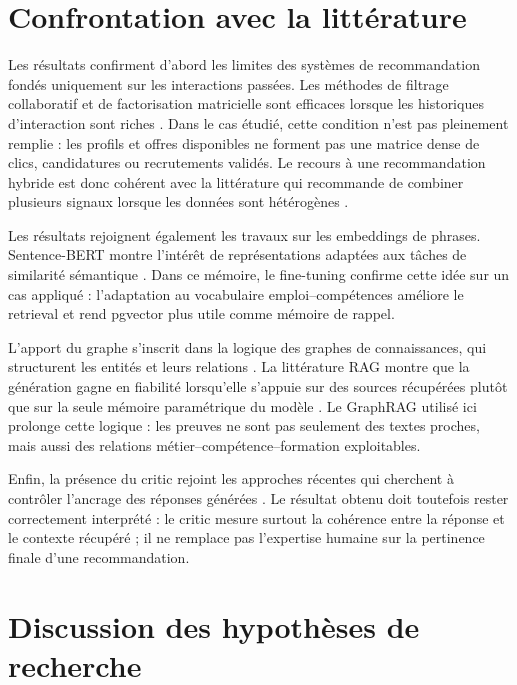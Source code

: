 \documentclass[12pt,twoside]{report}
\begin{document}
\section{Confrontation avec la littérature}

Les résultats confirment d'abord les limites des systèmes de recommandation fondés uniquement sur les interactions passées. Les méthodes de filtrage collaboratif et de factorisation matricielle sont efficaces lorsque les historiques d'interaction sont riches \cite{koren2009matrix,he2017ncf}. Dans le cas étudié, cette condition n'est pas pleinement remplie : les profils et offres disponibles ne forment pas une matrice dense de clics, candidatures ou recrutements validés. Le recours à une recommandation hybride est donc cohérent avec la littérature qui recommande de combiner plusieurs signaux lorsque les données sont hétérogènes \cite{burke2002hybrid,ricci2011recommender}.

Les résultats rejoignent également les travaux sur les embeddings de phrases. Sentence-BERT montre l'intérêt de représentations adaptées aux tâches de similarité sémantique \cite{reimers2019sbert}. Dans ce mémoire, le fine-tuning confirme cette idée sur un cas appliqué : l'adaptation au vocabulaire emploi--compétences améliore le retrieval et rend pgvector plus utile comme mémoire de rappel.

L'apport du graphe s'inscrit dans la logique des graphes de connaissances, qui structurent les entités et leurs relations \cite{hogan2021knowledge}. La littérature RAG montre que la génération gagne en fiabilité lorsqu'elle s'appuie sur des sources récupérées plutôt que sur la seule mémoire paramétrique du modèle \cite{lewis2020rag,gao2023ragllm}. Le GraphRAG utilisé ici prolonge cette logique : les preuves ne sont pas seulement des textes proches, mais aussi des relations métier--compétence--formation exploitables.

Enfin, la présence du critic rejoint les approches récentes qui cherchent à contrôler l'ancrage des réponses générées \cite{asai2024selfrag,es2024ragas}. Le résultat obtenu doit toutefois rester correctement interprété : le critic mesure surtout la cohérence entre la réponse et le contexte récupéré ; il ne remplace pas l'expertise humaine sur la pertinence finale d'une recommandation.

\section{Discussion des hypothèses de recherche}
\end{document}
